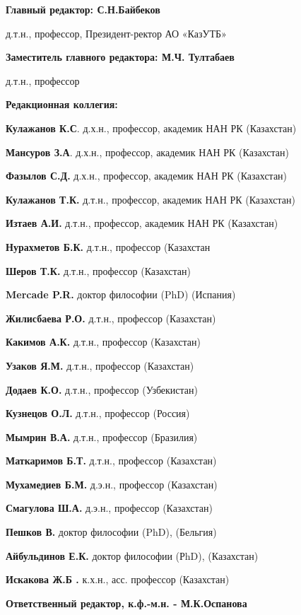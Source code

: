 \pagebreak
{\small
\begin{center}
\textbf{Главный редактор: С.Н.Байбеков}

д.т.н., профессор, Президент-ректор АО «КазУТБ»

\textbf{Заместитель главного редактора: М.Ч. Тултабаев}

д.т.н., профессор

\textbf{Редакционная коллегия:}
\end{center}

\textbf{Кулажанов К.С}. д.х.н., профессор, академик НАН РК (Казахстан)

\textbf{Мансуров З.А}. д.х.н., профессор, академик НАН РК (Казахстан)

\textbf{Фазылов С.Д.} д.х.н., профессор, академик НАН РК (Казахстан)

\textbf{Кулажанов Т.К.} д.т.н., профессор, академик НАН РК (Казахстан)

\textbf{Изтаев А.И.} д.т.н., профессор, академик НАН РК (Казахстан)

\textbf{Нурахметов Б.К.} д.т.н., профессор (Казахстан

\textbf{Шеров Т.К.} д.т.н., профессор (Казахстан)

\textbf{Mercade P.R.} доктор философии (PhD) (Испания)

\textbf{Жилисбаева Р.О.} д.т.н., профессор (Казахстан)

\textbf{Какимов А.К.} д.т.н., профессор (Казахстан)

\textbf{Узаков Я.М.} д.т.н., профессор (Казахстан)

\textbf{Додаев К.О.} д.т.н., профессор (Узбекистан)

\textbf{Кузнецов О.Л.} д.т.н., профессор (Россия)

\textbf{Мымрин В.А.} д.т.н., профессор (Бразилия)

\textbf{Маткаримов Б.Т.} д.т.н., профессор (Казахстан)

\textbf{Мухамедиев Б.М.} д.э.н., профессор (Казахстан)

\textbf{Смагулова Ш.А.} д.э.н., профессор (Казахстан)

\textbf{Пешков В.} доктор философии (PhD), (Бельгия)

\textbf{Айбульдинов Е.К.} доктор философии (РhD), (Казахстан)

\textbf{Искакова Ж.Б .} к.х.н., асс. профессор (Казахстан)

\begin{center}
\textbf{Ответственный редактор, к.ф.-м.н. - М.К.Оспанова}
\end{center}

}

